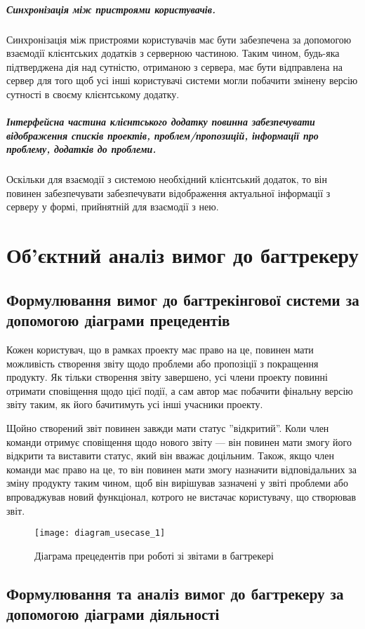 \documentclass[../main.tex]{subfiles}
\begin{document}
	\subparagraph{Синхронізація між пристроями користувачів.}
	Синхронізація між пристроями користувачів має бути забезпечена за допомогою взаємодії клієнтських додатків з серверною частиною. Таким чином, будь-яка підтверджена дія над сутністю, отриманою з сервера, має бути відправлена на сервер для того щоб усі інші користувачі системи могли побачити змінену версію сутності в своєму клієнтському додатку.
	
	\subparagraph{Інтерфейсна частина клієнтського додатку повинна забезпечувати відображення списків проектів, проблем/пропозицій, інформації про проблему, додатків до проблеми.}
	Оскільки для взаємодії з системою необхідний клієнтський додаток, то він повинен забезпечувати забезпечувати відображення актуальної інформації з серверу у формі, прийнятній для взаємодії з нею.

\section{Об'єктний аналіз вимог до багтрекеру}

	\subsection{Формулювання вимог до багтрекінгової системи за допомогою діаграми прецедентів}
	
	Кожен користувач, що в рамках проекту має право на це, повинен мати можливість створення звіту щодо проблеми або пропозіції з покращення продукту. Як тільки створення звіту завершено, усі члени проекту повинні отримати сповіщення щодо цієї події, а сам автор має побачити фінальну версію звіту таким, як його бачитимуть усі інші учасники проекту.
	
	Щойно створений звіт повинен завжди мати статус ''відкритий''. Коли член команди отримує сповіщення щодо нового звіту — він повинен мати змогу його відкрити та виставити статус, який він вважає доцільним. Також, якщо член команди має право на це, то він повинен мати змогу назначити відповідальних за зміну продукту таким чином, щоб він вирішував зазначені у звіті проблеми або впроваджував новий функціонал, котрого не вистачає користувачу, що створював звіт.
	
	\begin{figure}[H]
	\centering
	\texttt{[image: diagram\_usecase\_1]}
	\caption{Діаграма прецедентів при роботі зі звітами в багтрекері}
	\end{figure}
	
	\subsection{Формулювання та аналіз вимог до багтрекеру за допомогою діаграми діяльності}
	
\end{document}
